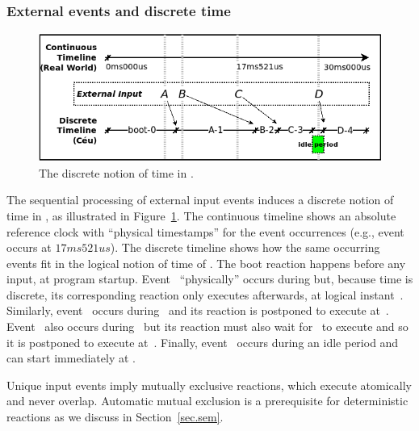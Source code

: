 \subsubsection*{External events and discrete time}

\begin{figure}[b]
\centering
\includegraphics[width=\columnwidth]{tick_min}
\caption{The discrete notion of time in \CEU.}
\label{fig.ticks}
\end{figure}

The sequential processing of external input events induces a discrete notion of
time in \CEU, as illustrated in Figure~\ref{fig.ticks}.
%
The continuous timeline shows an absolute reference clock with ``physical
timestamps'' for the event occurrences (e.g., event~ occurs at
$17ms521us$).
%
The discrete timeline shows how the same occurring events fit in the logical
notion of time of \CEU.
%
The boot reaction  happens before any input, at program startup.
%
Event~ ``physically'' occurs during  but, because time
is discrete, its corresponding reaction only executes afterwards, at logical
instant~.
%
Similarly, event~ occurs during~ and its reaction is
postponed to execute at~.
%
Event~ also occurs during~ but its reaction must also wait
for~ to execute and so it is postponed to execute at~.
%
Finally, event~ occurs during an idle period and can start immediately
at .
%

Unique input events imply mutually exclusive reactions, which execute
atomically and never overlap.
%
Automatic mutual exclusion is a prerequisite for deterministic reactions as
we discuss in Section~\ref{sec.sem}.
%

